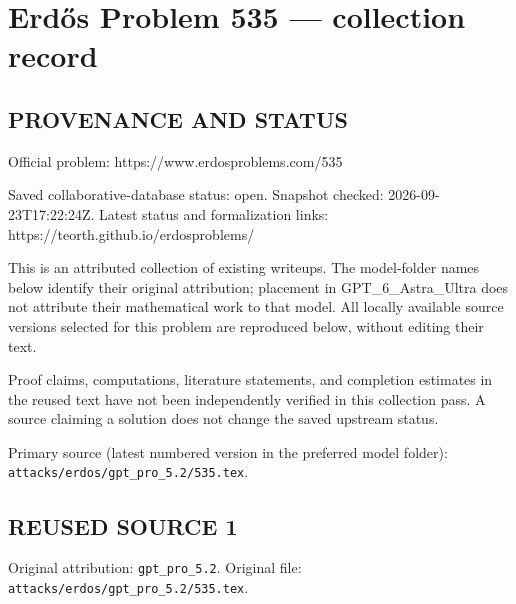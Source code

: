 \section*{Erd\H{o}s Problem 535 --- collection record}

\subsection*{PROVENANCE AND STATUS}
Official problem: https://www.erdosproblems.com/535

Saved collaborative-database status: open.
Snapshot checked: 2026-09-23T17:22:24Z.
Latest status and formalization links: https://teorth.github.io/erdosproblems/

This is an attributed collection of existing writeups. The model-folder names below identify their original attribution; placement in GPT\_6\_Astra\_Ultra does not attribute their mathematical work to that model. All locally available source versions selected for this problem are reproduced below, without editing their text.

Proof claims, computations, literature statements, and completion estimates in the reused text have not been independently verified in this collection pass. A source claiming a solution does not change the saved upstream status.

Primary source (latest numbered version in the preferred model folder): \texttt{attacks/erdos/gpt\_pro\_5.2/535.tex}.

\subsection*{REUSED SOURCE 1}
Original attribution: \texttt{gpt\_pro\_5.2}.
Original file: \texttt{attacks/erdos/gpt\_pro\_5.2/535.tex}.


